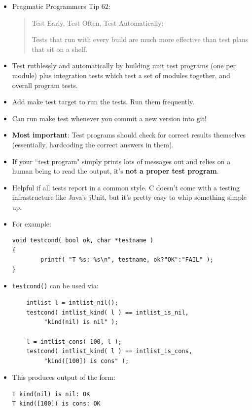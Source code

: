 \documentclass[handout]{beamer}
\newcommand{\pitem}{\pause \item}
\begin{document}
\begin{frame}[fragile]
    \begin{itemize}
      \item
	Pragmatic Programmers Tip 62:
\begin{quote}
Test Early, Test Often, Test Automatically:

Tests that run with every build are much more
effective than test plans that sit on a shelf.
\end{quote}
    \pause
    \item
      Test \alert{ruthlessly} and \alert{automatically}
      by building \alert{unit test} programs (one per module) plus
      \alert{integration} tests which test a set of modules together,
      and \alert{overall} program tests.
    \item
      Add \alert{make test} target to run the tests.
      Run them frequently.
    \item
      Can run \alert{make test}
      whenever you commit a new version into git!
    \pitem
      {\bf Most important}:
      Test programs should check for correct results themselves
      (essentially, hardcoding the correct answers in them).
    \pitem
      If your ``test program" simply prints lots of messages out
      and relies on a human being to read the output, it's
      {\bf not a proper test program}.

    \pitem
      Helpful if all tests report in a common style.
      C doesn't come with a testing infrastructure like Java's jUnit,
      but it's pretty easy to whip something simple up.
    \end{itemize}
\end{frame}

\begin{frame}[fragile]
    \begin{itemize}
      \item
      For example:

{\small
\begin{verbatim}
void testcond( bool ok, char *testname )
{
        printf( "T %s: %s\n", testname, ok?"OK":"FAIL" );
}
\end{verbatim}
}
	\item
	\verb+testcond()+ can be used via:

{\small
\begin{verbatim}
	intlist l = intlist_nil();
	testcond( intlist_kind( l ) == intlist_is_nil,
	     "kind(nil) is nil" );

	l = intlist_cons( 100, l );
	testcond( intlist_kind( l ) == intlist_is_cons,
	     "kind([100]) is cons" );
\end{verbatim}
}

      \item
      This produces output of the form:
{\small
\begin{verbatim}
T kind(nil) is nil: OK
T kind([100]) is cons: OK
\end{verbatim}
}

    \end{itemize}
\end{frame}
\end{document}
